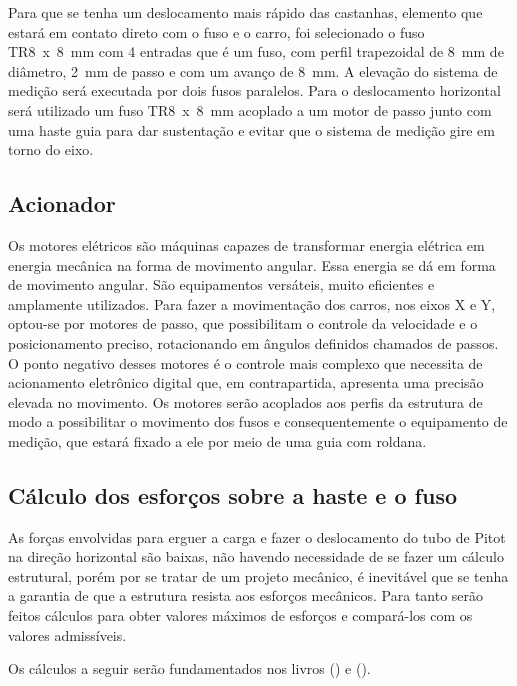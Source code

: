 Para que se tenha um deslocamento mais rápido das castanhas, elemento que estará em contato 
direto com o fuso e o carro, foi selecionado o fuso TR8~x~8~mm com 4 entradas que é um fuso, com perfil 
trapezoidal de 8~mm de diâmetro, 2~mm de passo e com um avanço de 8~mm. A elevação do sistema de medição será 
executada por dois fusos paralelos. Para o deslocamento horizontal será utilizado um fuso TR8~x~8~mm 
acoplado a um motor de passo junto com uma haste guia para dar sustentação e evitar que o sistema 
de medição gire em torno do eixo.

\subsection{Acionador}\label{subsec:metacionador}

Os motores elétricos são máquinas capazes de transformar energia elétrica em energia mecânica 
na forma de movimento angular. Essa energia se dá em forma de movimento angular. 
São equipamentos versáteis, muito eficientes e amplamente utilizados. Para fazer a movimentação dos carros, 
nos eixos X e Y, optou-se por motores de passo, que possibilitam o controle da velocidade 
e o posicionamento preciso, rotacionando em ângulos definidos chamados de passos. 
O ponto negativo desses motores é o controle mais complexo que necessita de acionamento eletrônico 
digital que, em contrapartida, apresenta uma precisão elevada no movimento. Os motores 
serão acoplados aos perfis da estrutura de modo a possibilitar o movimento dos fusos e consequentemente 
o equipamento de medição, que estará fixado a ele por meio de uma guia com roldana. 

\subsection{Cálculo dos esforços sobre a haste e o fuso}\label{subsec:metcalculos}

As forças envolvidas para erguer a carga e fazer o deslocamento do tubo de Pitot na direção horizontal 
são baixas, não havendo necessidade de se fazer um cálculo estrutural, porém por se tratar de 
um projeto mecânico, é inevitável que se tenha a garantia de que a estrutura resista aos 
esforços mecânicos. Para tanto serão feitos cálculos para obter valores máximos de esforços 
e compará-los com os valores admissíveis.

Os cálculos a seguir serão fundamentados nos livros \citeauthor{juvinall2020fundamentals} (\citeyear{juvinall2020fundamentals}) e \citeauthor{budynas2016elementos} (\citeyear{budynas2016elementos}).

